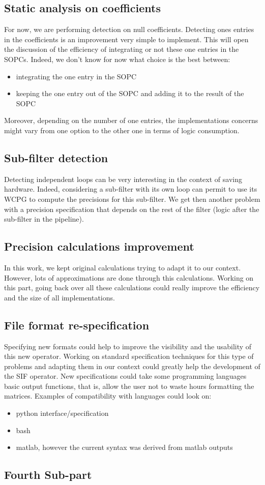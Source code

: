 \subsection{Static analysis on coefficients}
	For now, we are performing detection on null coefficients.
	Detecting ones entries in the coefficients is an improvement very simple to implement.
	This will open the discussion of the efficiency of integrating or not these one entries in the SOPCs.
	Indeed, we don't know for now what choice is the best between:
	\begin{itemize}
		\item integrating the one entry in the SOPC
		\item keeping the one entry out of the SOPC and adding it to the result of the SOPC
	\end{itemize}

	Moreover, depending on the number of one entries, the implementations concerns might vary from one option to the other one in terms of logic consumption.


\subsection{Sub-filter detection}
	Detecting independent loops can be very interesting in the context of saving hardware.
	Indeed, considering a sub-filter with its own loop can permit to use its WCPG to compute the precisions for this sub-filter.
	We get then another problem with a precision specification that depends on the rest of the filter (logic after the sub-filter in the pipeline).

\subsection{Precision calculations improvement}
	In this work, we kept original calculations trying to adapt it to our context.
	However, lots of approximations are done through this calculations.
	Working on this part, going back over all these calculations could really improve the efficiency and the size of all implementations.


\subsection{File format re-specification}
	Specifying new formats could help to improve the visibility and the usability of this new operator.
	Working on standard specification techniques for this type of problems and adapting them in our context could greatly help the development of the SIF operator.
	New specifications could take some programming languages basic output functions, that is, allow the user not to waste hours formatting the matrices.
	Examples of compatibility with languages could look on:
	\begin{itemize}
		\item python interface/specification
		\item bash
		\item matlab, however the current syntax was derived from matlab outputs
	\end{itemize}

\subsection{Fourth Sub-part}

